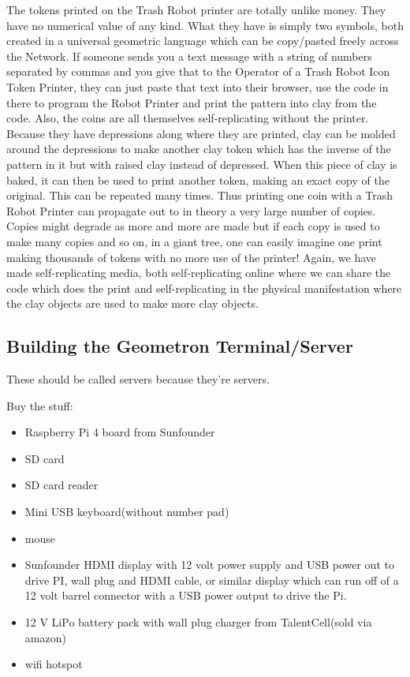 The tokens printed on the Trash Robot printer are totally unlike money.  They have no numerical value of any kind.  What they have is simply two symbols, both created in a universal geometric language which can be copy/pasted freely across the Network.  If someone sends you a text message with a string of numbers separated by commas and you give that to the Operator of a Trash Robot Icon Token Printer, they can just paste that text into their browser, use the code in there to program the Robot Printer and print the pattern into clay from the code. Also, the coins are all themselves self-replicating without the printer.  Because they have depressions along where they are printed, clay can be molded around the depressions to make another clay token which has the inverse of the pattern in it but with raised clay instead of depressed. When this piece of clay is baked, it can then be used to print another token, making an exact copy of the original.  This can be repeated many times. Thus printing one coin with a Trash Robot Printer can propagate out to in theory a very large number of copies.  Copies might degrade as more and more are made but if each copy is used to make many copies and so on, in a giant tree, one can easily imagine one print making thousands of tokens with no more use of the printer!  Again, we have made self-replicating media, both self-replicating online where we can share the code which does the print and self-replicating in the physical manifestation where the clay objects are used to make more clay objects.

\subsection{Building the Geometron Terminal/Server}

These should be called servers because they're servers.

Buy the stuff:

\begin{itemize}
\item
Raspberry Pi 4 board from Sunfounder
\item
SD card
\item
SD card reader
\item
Mini USB keyboard(without number pad)
\item
mouse
\item
Sunfounder HDMI display with 12 volt power supply and USB power out to drive PI, wall plug and HDMI cable, or similar display which can run off of a 12 volt barrel connector with a USB power output to drive the Pi.
\item
12 V LiPo battery pack with wall plug charger from TalentCell(sold via amazon)
\item
wifi hotspot
\end{itemize}

